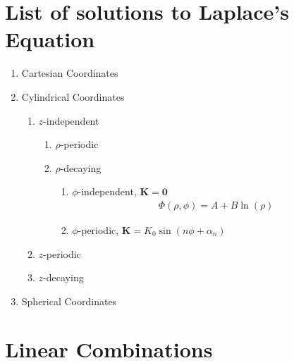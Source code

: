 \documentclass[10pt]{article}
\newcommand{\ve}[1]{\boldsymbol{\mathbf{#1}}}
\begin{document}
\section{List of solutions to Laplace's Equation}

\begin{enumerate}
	\item Cartesian Coordinates
	\item Cylindrical Coordinates
	\begin{enumerate}
		\item $z$-independent
		\begin{enumerate}
			\item $\rho$-periodic
			\item $\rho$-decaying
			\begin{enumerate}
				\item $\phi$-independent, $\ve{K} = \ve{0}$
					\begin{align}
						& \Phi(\rho, \phi) = A + B \ln(\rho)
						& 
					\end{align}
				\item $\phi$-periodic, $\ve{K} = K_0 \sin(n \phi + \alpha_n)$
			\end{enumerate}
		\end{enumerate}
		\item $z$-periodic
		\item $z$-decaying		
	\end{enumerate}
	\item Spherical Coordinates
\end{enumerate}

\section{Linear Combinations}
\end{document}
